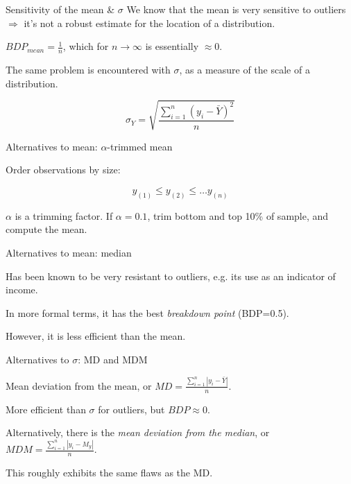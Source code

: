 \documentclass[12pt,english,pdf,xcolor=dvipsnames,aspectratio=169,handout]{beamer}\usepackage[]{graphicx}\usepackage[]{xcolor}
\begin{document}
\begin{frame}{Sensitivity of the mean \& $\sigma$}
We know that the mean is very sensitive to outliers $\Rightarrow$ it's not a robust estimate for the location of a distribution.\bigskip

$BDP_{mean} = \frac{1}{n}$, which for $n \rightarrow \infty$ is essentially $\approx 0$.\bigskip

The same problem is encountered with $\sigma$, as a measure of the scale of a distribution.

\begin{equation}
\sigma_Y = \sqrt{\frac{\sum_{i=1}^{n}(y_i - \bar{Y})^2}{n}}
\end{equation}

\end{frame}


\begin{frame}{Alternatives to mean: $\alpha$-trimmed mean}

Order observations by size:

\begin{equation}
y_{(1)} \leq y_{(2)} \leq \dots y_{(n)}
\end{equation}

$\alpha$ is a trimming factor. If $\alpha=0.1$, trim bottom and top 10\% of sample, and compute the mean.

\end{frame}



\begin{frame}{Alternatives to mean: median}

Has been known to be very resistant to outliers, e.g. its use as an indicator of income.\bigskip

In more formal terms, it has the best \textit{breakdown point} (BDP=0.5).\bigskip

However, it is less efficient than the mean.

\end{frame}



\begin{frame}{Alternatives to $\sigma$: MD and MDM}

Mean deviation from the mean, or $MD = \frac{\sum_{i=1}^n|y_i - \bar{Y}|}{n}$.\bigskip

More efficient than $\sigma$ for outliers, but $BDP \approx 0$.\bigskip

Alternatively, there is the \textit{mean deviation from the median}, or $MDM = \frac{\sum_{i=1}^n|y_i - M_y|}{n}$.\bigskip

This roughly exhibits the same flaws as the MD.

\end{frame}
\end{document}
